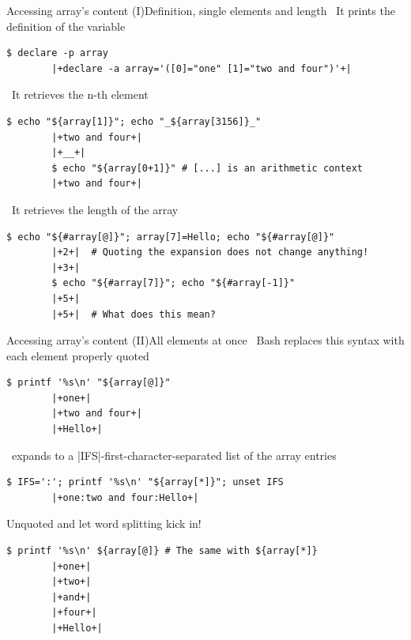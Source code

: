 \begin{frame}[fragile]{Accessing array's content (I)}{Definition, single elements and length}
    \vspace{-1mm}\centering
    \, It prints the definition of the variable 
    \smallskip
    \begin{lstlisting}[style=MyBash, numbers=none]
        $ declare -p array
        |+declare -a array='([0]="one" [1]="two and four")'+|
    \end{lstlisting}
    \medskip
    \, It retrieves the n-th element 
    \smallskip
    \begin{lstlisting}[style=MyBash, numbers=none]
        $ echo "${array[1]}"; echo "_${array[3156]}_"
        |+two and four+|
        |+__+|
        $ echo "${array[0+1]}" # [...] is an arithmetic context
        |+two and four+|
    \end{lstlisting}
    \medskip
    \, It retrieves the length of the array 
    \smallskip
    \begin{lstlisting}[style=MyBash, numbers=none]
        $ echo "${#array[@]}"; array[7]=Hello; echo "${#array[@]}"
        |+2+|  # Quoting the expansion does not change anything!
        |+3+|
        $ echo "${#array[7]}"; echo "${#array[-1]}"
        |+5+|
        |+5+|  # What does this mean?
    \end{lstlisting}
\end{frame}
\begin{frame}[fragile]{Accessing array's content (II)}{All elements at once}
    \vspace{-1mm}\centering
    \, Bash replaces this syntax with each element properly quoted
    \smallskip
    \begin{lstlisting}[style=MyBash, numbers=none]
        $ printf '%s\n' "${array[@]}"
        |+one+|
        |+two and four+|
        |+Hello+|
    \end{lstlisting}
    \medskip
    \, expands to a \bash|IFS|-first-character-separated list of the array entries
    \smallskip
    \begin{lstlisting}[style=MyBash, numbers=none]
        $ IFS=':'; printf '%s\n' "${array[*]}"; unset IFS
        |+one:two and four:Hello+|
    \end{lstlisting}
    \medskip
    Unquoted  and  let \alert{word splitting} kick in!
    \smallskip
    \begin{lstlisting}[style=MyBash, numbers=none]
        $ printf '%s\n' ${array[@]} # The same with ${array[*]}
        |+one+|
        |+two+|
        |+and+|
        |+four+|
        |+Hello+|
    \end{lstlisting}
\end{frame}
